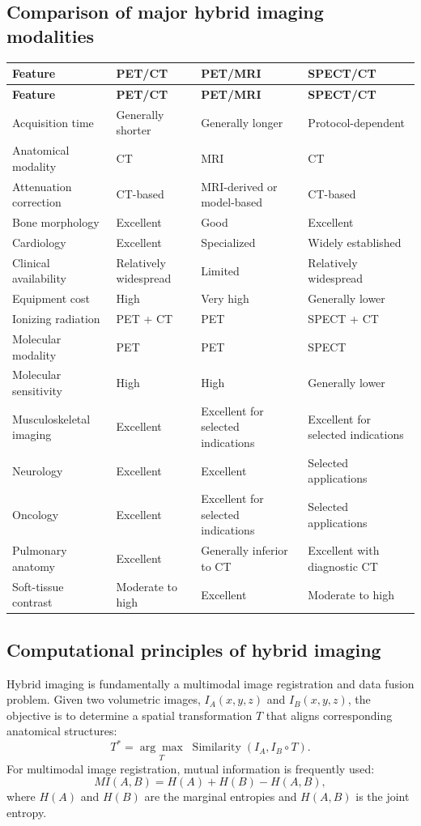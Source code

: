 \subsection{Comparison of major hybrid imaging modalities}
\begin{longtable}{@{}p{}p{}p{}p{}@{}}
\toprule
\textbf{Feature} & \textbf{PET/CT} & \textbf{PET/MRI} & \textbf{SPECT/CT} \\
\midrule
\endfirsthead
\toprule
\textbf{Feature} & \textbf{PET/CT} & \textbf{PET/MRI} & \textbf{SPECT/CT} \\
\midrule
\endhead
Acquisition time & Generally shorter & Generally longer & Protocol-dependent \\
Anatomical modality & CT & MRI & CT \\
Attenuation correction & CT-based & MRI-derived or model-based & CT-based \\
Bone morphology & Excellent & Good & Excellent \\
Cardiology & Excellent & Specialized & Widely established \\
Clinical availability & Relatively widespread & Limited & Relatively widespread \\
Equipment cost & High & Very high & Generally lower \\
Ionizing radiation & PET + CT & PET & SPECT + CT \\
Molecular modality & PET & PET & SPECT \\
Molecular sensitivity & High & High & Generally lower \\
Musculoskeletal imaging & Excellent & Excellent for selected indications & Excellent for selected indications \\
Neurology & Excellent & Excellent & Selected applications \\
Oncology & Excellent & Excellent for selected indications & Selected applications \\
Pulmonary anatomy & Excellent & Generally inferior to CT & Excellent with diagnostic CT \\
Soft-tissue contrast & Moderate to high & Excellent & Moderate to high \\
\bottomrule
\end{longtable}

\subsection{Computational principles of hybrid imaging}
Hybrid imaging is fundamentally a multimodal image registration and data fusion problem. Given two volumetric images, $I_A(x,y,z)$ and $I_B(x,y,z)$, the objective is to determine a spatial transformation $T$ that aligns corresponding anatomical structures:
\begin{equation}
T^*=\underset{T}{\arg\max}\;\operatorname{Similarity}(I_A,I_B\circ T).
\end{equation}
For multimodal image registration, mutual information is frequently used:
\begin{equation}
MI(A,B)=H(A)+H(B)-H(A,B),
\end{equation}
where $H(A)$ and $H(B)$ are the marginal entropies and $H(A,B)$ is the joint entropy.

